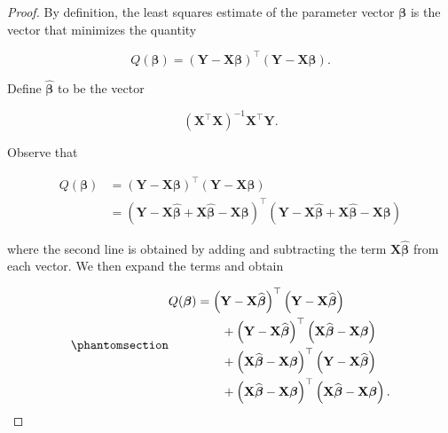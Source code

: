 \documentclass[
  letterpaper,
  DIV=11,
  numbers=noendperiod]{scrreprt}
\theoremstyle{definition}
\theoremstyle{plain}
\theoremstyle{definition}
\theoremstyle{remark}
\begin{document}
\begin{proof}
By definition, the least squares estimate of the parameter vector
\(\boldsymbol{\beta}\) is the vector that minimizes the quantity

\[Q(\boldsymbol{\beta}) = \left(\mathbf{Y} - \mathbf{X} \boldsymbol{\beta}\right)^\top \left(\mathbf{Y} - \mathbf{X} \boldsymbol{\beta}\right).\]

Define \(\widehat{\boldsymbol{\beta}}\) to be the vector

\[\left(\mathbf{X}^\top \mathbf{X}\right)^{-1} \mathbf{X}^\top \boldsymbol{Y}.\]

Observe that

\[
\begin{aligned}
  Q(\boldsymbol{\beta})
    &= \left(\mathbf{Y} - \mathbf{X} \boldsymbol{\beta}\right)^\top \left(\mathbf{Y} - \mathbf{X} \boldsymbol{\beta}\right) \\
    &= \left(\mathbf{Y} - \mathbf{X}\widehat{\boldsymbol{\beta}} + \mathbf{X}\widehat{\boldsymbol{\beta}} - \mathbf{X}\boldsymbol{\beta}\right)^\top \left(\mathbf{Y} - \mathbf{X}\widehat{\boldsymbol{\beta}} + \mathbf{X}\widehat{\boldsymbol{\beta}} - \mathbf{X}\boldsymbol{\beta}\right)
\end{aligned}
\]

where the second line is obtained by adding and subtracting the term
\(\mathbf{X}\widehat{\boldsymbol{\beta}}\) from each vector. We then
expand the terms and obtain

\begin{equation}\phantomsection\label{eq-proof-q}{
\begin{aligned}
  Q(\boldsymbol{\beta})
    &= \left(\mathbf{Y} - \mathbf{X}\widehat{\boldsymbol{\beta}}\right)^\top \left(\mathbf{Y} - \mathbf{X}\widehat{\boldsymbol{\beta}}\right) \\
    &\qquad + \left(\mathbf{Y} - \mathbf{X}\widehat{\boldsymbol{\beta}}\right)^\top \left(\mathbf{X}\widehat{\boldsymbol{\beta}} - \mathbf{X}\boldsymbol{\beta}\right) \\
    &\qquad + \left(\mathbf{X}\widehat{\boldsymbol{\beta}} - \mathbf{X}\boldsymbol{\beta}\right)^\top \left(\mathbf{Y} - \mathbf{X}\widehat{\boldsymbol{\beta}}\right) \\
    &\qquad + \left(\mathbf{X}\widehat{\boldsymbol{\beta}} - \mathbf{X}\boldsymbol{\beta}\right)^\top \left(\mathbf{X}\widehat{\boldsymbol{\beta}} - \mathbf{X}\boldsymbol{\beta}\right).
\end{aligned}
}\end{equation}


\end{proof}
\end{document}
